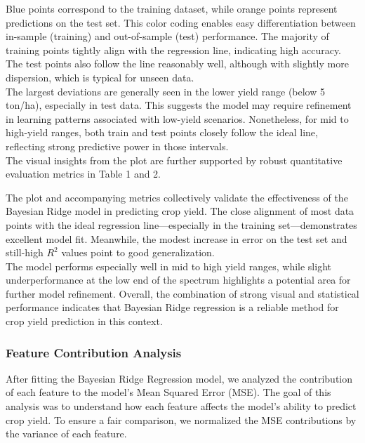 Blue points correspond to the training dataset, while orange points represent predictions on the test set. This color coding enables easy differentiation between in-sample (training) and out-of-sample (test) performance. The majority of training points tightly align with the regression line, indicating high accuracy. The test points also follow the line reasonably well, although with slightly more dispersion, which is typical for unseen data. \\

The largest deviations are generally seen in the lower yield range (below 5 ton/ha), especially in test data. This suggests the model may require refinement in learning patterns associated with low-yield scenarios. Nonetheless, for mid to high-yield ranges, both train and test points closely follow the ideal line, reflecting strong predictive power in those intervals.\\

The visual insights from the plot are further supported by robust quantitative evaluation metrics in Table 1 and 2.


The plot and accompanying metrics collectively validate the effectiveness of the Bayesian Ridge model in predicting crop yield. The close alignment of most data points with the ideal regression line—especially in the training set—demonstrates excellent model fit. Meanwhile, the modest increase in error on the test set and still-high $R^2$ values point to good generalization.\\

The model performs especially well in mid to high yield ranges, while slight underperformance at the low end of the spectrum highlights a potential area for further model refinement. Overall, the combination of strong visual and statistical performance indicates that Bayesian Ridge regression is a reliable method for crop yield prediction in this context.\\



\subsubsection{Feature Contribution Analysis}

After fitting the Bayesian Ridge Regression model, we analyzed the contribution of each feature to the model's Mean Squared Error (MSE). The goal of this analysis was to understand how each feature affects the model's ability to predict crop yield. To ensure a fair comparison, we normalized the MSE contributions by the variance of each feature.

